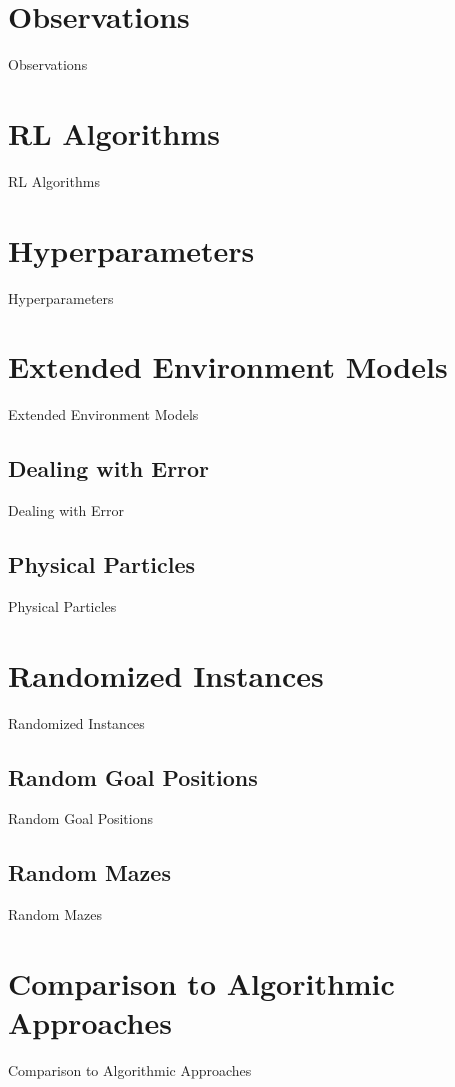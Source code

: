 \section{Observations} \label{sec:EvalObs}
Observations
\section{RL Algorithms} \label{sec:EvalRLAlgorithms}
RL Algorithms
\section{Hyperparameters} \label{sec:EvalParameters}
Hyperparameters
\section{Extended Environment Models} \label{sec:EvalExtendedModels}
Extended Environment Models
\subsection{Dealing with Error} \label{sec:EvalError}
Dealing with Error
\subsection{Physical Particles} \label{sec:EvalPhysical}
Physical Particles
\section{Randomized Instances} \label{sec:EvalRandomness}
Randomized Instances
\subsection{Random Goal Positions} \label{sec:EvalRandomGoals}
Random Goal Positions
\subsection{Random Mazes} \label{sec:EvalRandomMaze}
Random Mazes
\section{Comparison to Algorithmic Approaches} \label{sec:EvalAlgorithms}
Comparison to Algorithmic Approaches